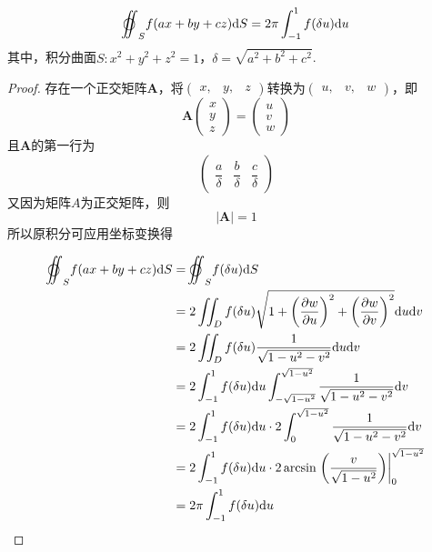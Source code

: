 \begin{theorem}\label{theorem:surface}

    \[\ooint_{S}{f(ax + by + cz)}\diff S = 2\pi\int_{-1}^{1}{f(\delta u)}\diff u\]
    其中，积分曲面$S: x^2 + y^2 + z^2 = 1$，$\delta = \sqrt{a^2 + b^2 + c^2}$.

\end{theorem}

\begin{proof}

    存在一个正交矩阵$\boldsymbol{A}$，将$(\begin{smallmatrix} x, & y, & z \end{smallmatrix})$转换为$(\begin{smallmatrix} u, & v, & w \end{smallmatrix})$，即
    \[
        \boldsymbol{A}
        \begin{pmatrix}
            x \\
            y \\
            z
        \end{pmatrix} = 
        \begin{pmatrix}
            u \\
            v \\
            w
        \end{pmatrix}
    \]
    且$\boldsymbol{A}$的第一行为
    \[
        \begin{pmatrix}
            \dfrac{a}{\delta} & \dfrac{b}{\delta} & \dfrac{c}{\delta}
        \end{pmatrix}
    \]
    又因为矩阵$A$为正交矩阵，则
    \[|\boldsymbol{A}| = 1\]
    所以原积分可应用坐标变换得
    
    \begin{align*}
        \ooint_{S}{f(ax + by + cz)}\diff S & = \ooint_{S}{f(\delta u)}\diff S \\
        & = 2\iint_{D}{f(\delta u) \sqrt{1 + \left( \dfrac{\partial w}{\partial u} \right)^2 + \left( \dfrac{\partial w}{\partial v} \right)^2}}\diff u \diff v \\
        & = 2\iint_{D}{f(\delta u) \dfrac{1}{\sqrt{1 - u^2 - v^2}}}\diff u \diff v \\
        & = 2\int_{-1}^{1}{f(\delta u)}\diff u \int_{-\sqrt{1 - u^2}}^{\sqrt{1 - u^2}}{\dfrac{1}{\sqrt{1 - u^2 - v^2}}}\diff v \\
        & = 2\int_{-1}^{1}{f(\delta u)}\diff u \cdot 2 \int_{0}^{\sqrt{1 - u^2}}{\dfrac{1}{\sqrt{1 - u^2 - v^2}}}\diff v \\
        & = 2\int_{-1}^{1}{f(\delta u)}\diff u \cdot 2\arcsin\left. \left( \dfrac{v}{\sqrt{1 - u^2}} \right) \right|_{0}^{\sqrt{1 - u^2}} \\
        & = 2\pi\int_{-1}^{1}{f(\delta u)}\diff u
    \end{align*}

\end{proof}

